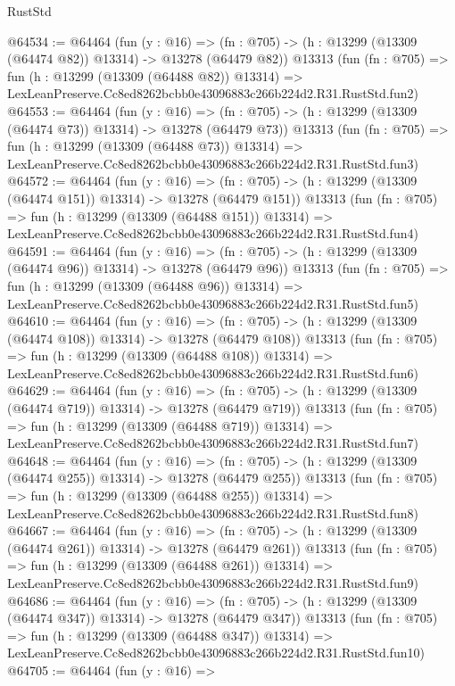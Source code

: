 \begin{lexlean}{RustStd}
\begin{coremodule}
@64534 := @64464
    (fun (y : @16) =>
    (fn : @705) -> (h : @13299 (@13309 (@64474 @82)) @13314) -> @13278 (@64479 @82))
    @13313
    (fun (fn : @705) =>
    fun (h : @13299 (@13309 (@64488 @82)) @13314) =>
    LexLeanPreserve.Cc8ed8262bcbb0e43096883c266b224d2.R31.RustStd.fun2)
@64553 := @64464
    (fun (y : @16) =>
    (fn : @705) -> (h : @13299 (@13309 (@64474 @73)) @13314) -> @13278 (@64479 @73))
    @13313
    (fun (fn : @705) =>
    fun (h : @13299 (@13309 (@64488 @73)) @13314) =>
    LexLeanPreserve.Cc8ed8262bcbb0e43096883c266b224d2.R31.RustStd.fun3)
@64572 := @64464
    (fun (y : @16) =>
    (fn : @705) -> (h : @13299 (@13309 (@64474 @151)) @13314) -> @13278 (@64479 @151))
    @13313
    (fun (fn : @705) =>
    fun (h : @13299 (@13309 (@64488 @151)) @13314) =>
    LexLeanPreserve.Cc8ed8262bcbb0e43096883c266b224d2.R31.RustStd.fun4)
@64591 := @64464
    (fun (y : @16) =>
    (fn : @705) -> (h : @13299 (@13309 (@64474 @96)) @13314) -> @13278 (@64479 @96))
    @13313
    (fun (fn : @705) =>
    fun (h : @13299 (@13309 (@64488 @96)) @13314) =>
    LexLeanPreserve.Cc8ed8262bcbb0e43096883c266b224d2.R31.RustStd.fun5)
@64610 := @64464
    (fun (y : @16) =>
    (fn : @705) -> (h : @13299 (@13309 (@64474 @108)) @13314) -> @13278 (@64479 @108))
    @13313
    (fun (fn : @705) =>
    fun (h : @13299 (@13309 (@64488 @108)) @13314) =>
    LexLeanPreserve.Cc8ed8262bcbb0e43096883c266b224d2.R31.RustStd.fun6)
@64629 := @64464
    (fun (y : @16) =>
    (fn : @705) -> (h : @13299 (@13309 (@64474 @719)) @13314) -> @13278 (@64479 @719))
    @13313
    (fun (fn : @705) =>
    fun (h : @13299 (@13309 (@64488 @719)) @13314) =>
    LexLeanPreserve.Cc8ed8262bcbb0e43096883c266b224d2.R31.RustStd.fun7)
@64648 := @64464
    (fun (y : @16) =>
    (fn : @705) -> (h : @13299 (@13309 (@64474 @255)) @13314) -> @13278 (@64479 @255))
    @13313
    (fun (fn : @705) =>
    fun (h : @13299 (@13309 (@64488 @255)) @13314) =>
    LexLeanPreserve.Cc8ed8262bcbb0e43096883c266b224d2.R31.RustStd.fun8)
@64667 := @64464
    (fun (y : @16) =>
    (fn : @705) -> (h : @13299 (@13309 (@64474 @261)) @13314) -> @13278 (@64479 @261))
    @13313
    (fun (fn : @705) =>
    fun (h : @13299 (@13309 (@64488 @261)) @13314) =>
    LexLeanPreserve.Cc8ed8262bcbb0e43096883c266b224d2.R31.RustStd.fun9)
@64686 := @64464
    (fun (y : @16) =>
    (fn : @705) -> (h : @13299 (@13309 (@64474 @347)) @13314) -> @13278 (@64479 @347))
    @13313
    (fun (fn : @705) =>
    fun (h : @13299 (@13309 (@64488 @347)) @13314) =>
    LexLeanPreserve.Cc8ed8262bcbb0e43096883c266b224d2.R31.RustStd.fun10)
@64705 := @64464
    (fun (y : @16) =>

\end{coremodule}
\end{lexlean}
